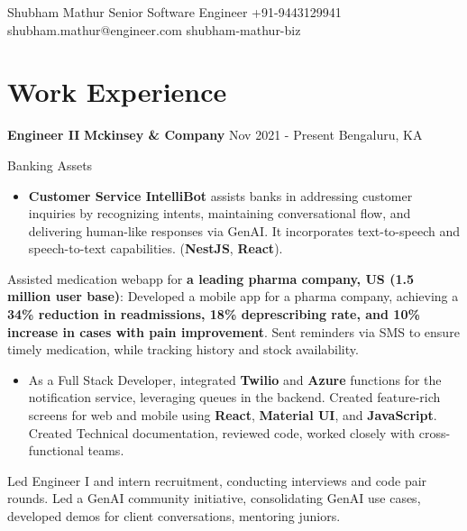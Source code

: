 \documentclass[letterpaper]{resume_config}
\begin{document}
\Header
    {Shubham Mathur} %
    {Senior Software Engineer}
    {+91-9443129941} %
    {shubham.mathur@engineer.com} %
    {shubham-mathur-biz} %

\section{\textcolor{NavyBlue}{Work Experience}}

\WorkExperience
    {\textbf{Engineer II}} %
    {\textbf{Mckinsey \& Company}} %
    {Nov 2021 - Present} %
    {Bengaluru, KA} %
    {
    \item{Banking Assets}
        \begin{itemize}
          \item{\textbf{Customer Service IntelliBot} assists banks in addressing customer inquiries by recognizing intents, maintaining conversational flow, and delivering human-like responses via GenAI. It incorporates text-to-speech and speech-to-text capabilities. (\textbf{NestJS}, \textbf{React}).}
        \end{itemize}
    \item{Assisted medication webapp for \textbf{a leading pharma company, US (1.5 million user base)}: Developed a mobile app for a pharma company, achieving a \textbf{34\% reduction in readmissions, 18\% deprescribing rate, and 10\% increase in cases with pain improvement}. Sent reminders via SMS to ensure timely medication, while tracking history and stock availability.}
    
    \begin{itemize}
        \item{As a Full Stack Developer, integrated \textbf{Twilio} and \textbf{Azure} functions for the notification service, leveraging queues in the backend. Created feature-rich screens for web and mobile using \textbf{React}, \textbf{Material UI}, and \textbf{JavaScript}. Created Technical documentation, reviewed code, worked closely with cross-functional teams.}

    \end{itemize}
        \item Led Engineer I and intern recruitment, conducting interviews and code pair rounds. Led a GenAI community initiative, consolidating GenAI use cases, developed demos for client conversations, mentoring juniors.
    } 
\end{document}
